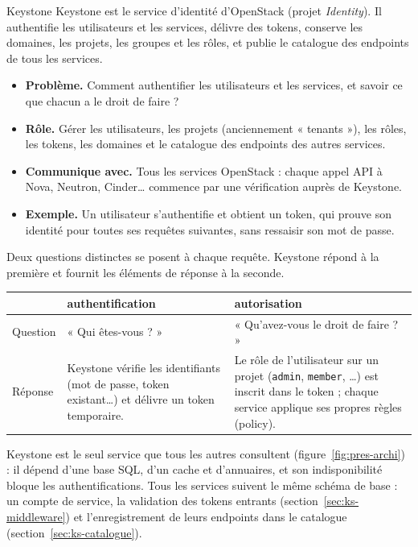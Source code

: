 \begin{definition}{Keystone}
Keystone est le service d'identité d'OpenStack (projet \emph{Identity}). Il authentifie les
utilisateurs et les services, délivre des \glspl{token}, conserve les domaines, les projets, les
groupes et les rôles, et publie le \gls{catalogue} des endpoints de tous les services.
\end{definition}

\begin{itemize}
  \item \textbf{Problème.} Comment authentifier les utilisateurs et les services, et savoir ce que
        chacun a le droit de faire ?
  \item \textbf{Rôle.} Gérer les utilisateurs, les projets (anciennement « tenants »), les rôles, les
        tokens, les domaines et le catalogue des endpoints des autres services.
  \item \textbf{Communique avec.} Tous les services OpenStack : chaque appel API à Nova, Neutron,
        Cinder\dots{} commence par une vérification auprès de Keystone.
  \item \textbf{Exemple.} Un utilisateur s'authentifie et obtient un token, qui prouve son identité
        pour toutes ses requêtes suivantes, sans ressaisir son mot de passe.
\end{itemize}

Deux questions distinctes se posent à chaque requête. Keystone répond à la première et fournit les
éléments de réponse à la seconde.

\begin{center}
\renewcommand{\arraystretch}{1.3}
\begin{tabular}{@{}p{2.2cm}p{5.8cm}p{7.2cm}@{}}
\toprule
 & \textbf{\Gls{authentification}} & \textbf{\Gls{autorisation}} \\
\midrule
Question & « Qui êtes-vous ? » & « Qu'avez-vous le droit de faire ? » \\
Réponse & Keystone vérifie les identifiants (mot de passe, token existant\dots) et délivre un
  token temporaire. & Le rôle de l'utilisateur sur un projet (\texttt{admin}, \texttt{member},
  \dots) est inscrit dans le token ; chaque service applique ses propres règles
  (\gls{policy}). \\
\bottomrule
\end{tabular}
\end{center}

Keystone est le seul service que tous les autres consultent (figure~\ref{fig:pres-archi}) : il dépend d'une base SQL, d'un cache et
d'annuaires, et son indisponibilité bloque les authentifications. Tous les services suivent le même schéma de base : un compte de
service, la validation des tokens entrants (section~\ref{sec:ks-middleware}) et l'enregistrement de leurs endpoints dans le catalogue
(section~\ref{sec:ks-catalogue}).

